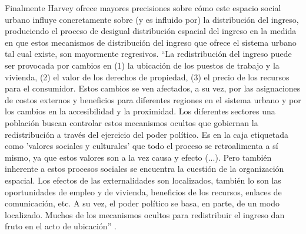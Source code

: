 
Finalmente Harvey ofrece mayores precisiones sobre cómo este espacio social urbano influye concretamente sobre (y es influido por) la distribución del ingreso, produciendo el proceso de desigual distribución espacial del ingreso en la medida en que estos mecanismos de distribución del ingreso que ofrece el sistema urbano tal cual existe, son mayormente regresivos. “La redistribución del ingreso puede ser provocada por cambios en (1) la ubicación de los puestos de trabajo y la vivienda, (2) el valor de los derechos de propiedad, (3) el precio de los recursos para el consumidor. Estos cambios se ven afectados, a su vez, por las asignaciones de costos externos y beneficios para diferentes regiones en el sistema urbano y por los cambios en la accesibilidad y la proximidad. Los diferentes sectores una población buscan controlar estos mecanismos ocultos que gobiernan la redistribución a través del ejercicio del poder político. Es en la caja etiquetada como 'valores sociales y culturales' que todo el proceso se retroalimenta a sí mismo, ya que estos valores son a la vez causa y efecto (...). Pero también inherente a estos procesos sociales se encuentra la cuestión de la organización espacial. Los efectos de las externalidades son localizados, también lo son las oportunidades de empleo y de vivienda, beneficios de los recursos, enlaces de comunicación, etc. A su vez, el poder político se basa, en parte, de un modo localizado. Muchos de los mecanismos ocultos para redistribuir el ingreso dan fruto en el acto de ubicación” \cite[~86]{harvey}.

